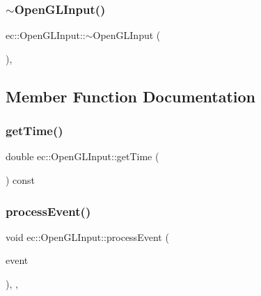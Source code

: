 \subsubsection{\texorpdfstring{$\sim$\+Open\+G\+L\+Input()}{~OpenGLInput()}}
{\footnotesize\ttfamily ec\+::\+Open\+G\+L\+Input\+::$\sim$\+Open\+G\+L\+Input (\begin{DoxyParamCaption}{ }\end{DoxyParamCaption})\hspace{0.3cm}{\ttfamily [virtual]}, {\ttfamily [default]}}



\subsection{Member Function Documentation}
\mbox{\label{classec_1_1_open_g_l_input_a5a4c1780a904c55d5ac38272234b87a7}} 
\subsubsection{\texorpdfstring{get\+Time()}{getTime()}}
{\footnotesize\ttfamily double ec\+::\+Open\+G\+L\+Input\+::get\+Time (\begin{DoxyParamCaption}{ }\end{DoxyParamCaption}) const\hspace{0.3cm}{\ttfamily [override]}}

\mbox{\label{classec_1_1_open_g_l_input_a064a4e318e18d79ad8df19c789f84686}} 
\subsubsection{\texorpdfstring{process\+Event()}{processEvent()}}
{\footnotesize\ttfamily void ec\+::\+Open\+G\+L\+Input\+::process\+Event (\begin{DoxyParamCaption}\item[{const \mbox{\hyperlink{structec_1_1_input_event}{ec\+::\+Input\+Event}} \&}]{event }\end{DoxyParamCaption})\hspace{0.3cm}{\ttfamily [override]}, {\ttfamily [protected]}, {\ttfamily [virtual]}}




